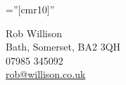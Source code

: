 \documentclass[a4paper,12pt]{article}
\begin{document}

\pagestyle{empty} %

\font\fb=''[cmr10]'' %


\par{\centering
		{\LARGE Rob Willison\\
		\small Bath, Somerset, BA2 3QH\\
		07985 345092\\
		\href{mailto:rob@willison.co.uk}{rob@willison.co.uk
	}\bigskip\par}

}
\end{document}
